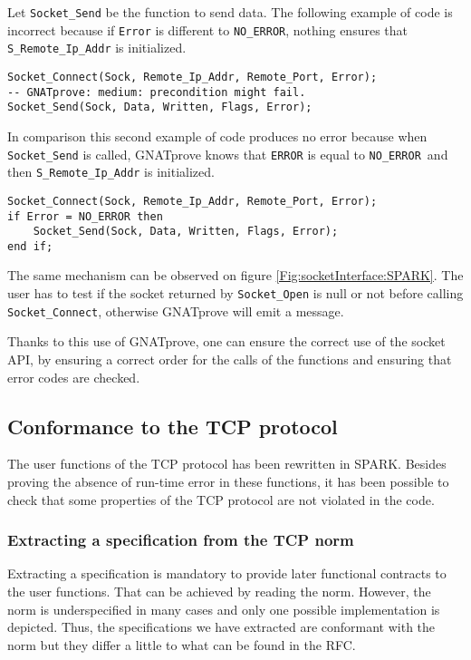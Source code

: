 \documentclass[runningheads]{llncs}
\begin{document}
    Let \lstinline{Socket_Send} be the function to send data. The following example of code is incorrect because if \lstinline{Error} is
    different to \lstinline{NO_ERROR}, nothing ensures that \lstinline{S_Remote_Ip_Addr} is initialized.
    \begin{lstlisting}
Socket_Connect(Sock, Remote_Ip_Addr, Remote_Port, Error);
-- GNATprove: medium: precondition might fail.
Socket_Send(Sock, Data, Written, Flags, Error);
    \end{lstlisting}
    In comparison this second example of code produces no error because when \lstinline{Socket_Send} is called, GNATprove knows that
    \lstinline{ERROR} is equal to \lstinline{NO_ERROR} and then \lstinline{S_Remote_Ip_Addr} is initialized.
    \begin{lstlisting}
Socket_Connect(Sock, Remote_Ip_Addr, Remote_Port, Error);
if Error = NO_ERROR then
    Socket_Send(Sock, Data, Written, Flags, Error);
end if;
    \end{lstlisting}

    The same mechanism can be observed on figure \ref{Fig:socketInterface:SPARK}. The user has to test if the socket returned by
    \lstinline{Socket_Open} is null or not before calling \lstinline{Socket_Connect}, otherwise GNATprove will emit a message.

    Thanks to this use of GNATprove, one can ensure the correct use of the socket API, by ensuring a correct order for the
    calls of the functions and ensuring that error codes are checked.


\subsection{Conformance to the TCP protocol}

    The user functions of the TCP protocol has been rewritten in SPARK. Besides proving the absence of run-time error in these functions,
    it has been possible to check that some properties of the TCP protocol are not violated in the code.

\subsubsection{Extracting a specification from the TCP norm}

    Extracting a specification is mandatory to provide later functional contracts to the user functions.
    That can be achieved by reading the norm. However, the norm is underspecified in many cases and only one possible implementation
    is depicted. Thus, the specifications we have extracted are conformant with the norm but they differ a little to
    what can be found in the RFC.
\end{document}
